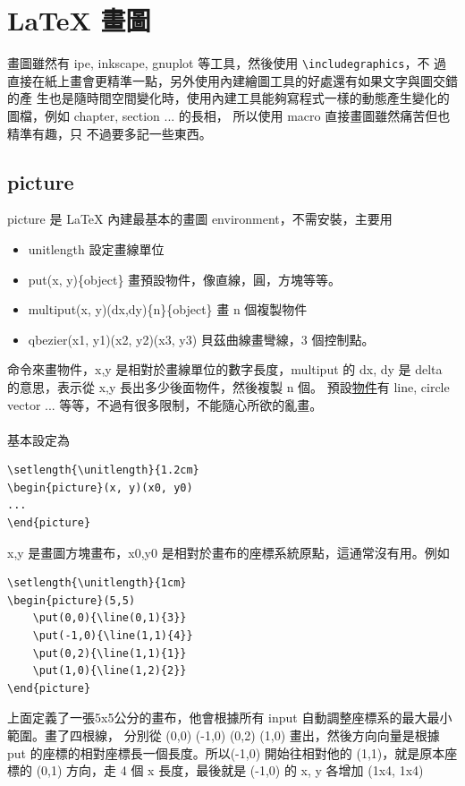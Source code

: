 \chapter{\LaTeX{} 畫圖}
畫圖雖然有 ipe, inkscape, gnuplot 等工具，然後使用 \verb=\includegraphics=，不
過直接在紙上畫會更精準一點，另外使用內建繪圖工具的好處還有如果文字與圖交錯的產
生也是隨時間空間變化時，使用內建工具能夠寫程式一樣的動態產生變化的圖檔，例如
chapter, section ... 的長相， 所以使用 macro 直接畫圖雖然痛苦但也精準有趣，只
不過要多記一些東西。

\section{picture}
picture 是 \LaTeX{} 內建最基本的畫圖 environment，不需安裝，主要用 
\begin{itemize}
  \item unitlength 設定畫線單位
  \item put(x, y)\{object\} 畫預設物件，像直線，圓，方塊等等。
  \item multiput(x, y)(dx,dy)\{n\}\{object\} 畫 n 個複製物件
  \item qbezier(x1, y1)(x2, y2)(x3, y3) 貝茲曲線畫彎線，3 個控制點。
\end{itemize}
命令來畫物件，x,y 是相對於畫線單位的數字長度，multiput 的 dx, dy 是
delta 的意思，表示從 x,y 長出多少後面物件，然後複製 n 個。
預設\href{https://latexref.xyz/picture.html}{物件}有 line, circle vector ...
等等，不過有很多限制，不能隨心所欲的亂畫。
\\\\
基本設定為
\begin{verbatim}
\setlength{\unitlength}{1.2cm}
\begin{picture}(x, y)(x0, y0)
...
\end{picture}
\end{verbatim}
x,y 是畫圖方塊畫布，x0,y0 是相對於畫布的座標系統原點，這通常沒有用。例如
\begin{verbatim}
\setlength{\unitlength}{1cm}
\begin{picture}(5,5)
    \put(0,0){\line(0,1){3}}
    \put(-1,0){\line(1,1){4}}
    \put(0,2){\line(1,1){1}}
    \put(1,0){\line(1,2){2}}
\end{picture}
\end{verbatim}
上面定義了一張5x5公分的畫布，他會根據所有 input 自動調整座標系的最大最小
範圍。畫了四根線， 分別從 (0,0) (-1,0) (0,2) (1,0) 畫出，然後方向向量是根據
put 的座標的相對座標長一個長度。所以(-1,0) 開始往相對他的 (1,1)，就是原本座
標的 (0,1) 方向，走 4 個 x 長度，最後就是 (-1,0) 的 x, y 各增加 (1x4, 1x4)

